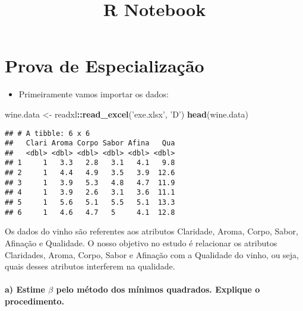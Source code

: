 \documentclass[
]{article}
\title{R Notebook}
\author{}
\date{\vspace{-2.5em}}
\newenvironment{Shaded}{\begin{snugshade}}{\end{snugshade}}
\newcommand{\KeywordTok}[1]{\textcolor[rgb]{0.13,0.29,0.53}{\textbf{#1}}}
\newcommand{\NormalTok}[1]{#1}
\newcommand{\OperatorTok}[1]{\textcolor[rgb]{0.81,0.36,0.00}{\textbf{#1}}}
\newcommand{\StringTok}[1]{\textcolor[rgb]{0.31,0.60,0.02}{#1}}
\providecommand{\tightlist}{%
  \setlength{\itemsep}{0pt}\setlength{\parskip}{0pt}}
\begin{document}
\maketitle

\hypertarget{prova-de-especializauxe7uxe3o}{%
\section{Prova de Especialização}\label{prova-de-especializauxe7uxe3o}}

\begin{itemize}
\tightlist
\item
  Primeiramente vamos importar os dados:
\end{itemize}

\begin{Shaded}
\begin{Highlighting}[]
\NormalTok{wine.data <-}\StringTok{ }\NormalTok{readxl}\OperatorTok{::}\KeywordTok{read_excel}\NormalTok{(}\StringTok{'exe.xlsx'}\NormalTok{, }\StringTok{'D'}\NormalTok{)}
\KeywordTok{head}\NormalTok{(wine.data)}
\end{Highlighting}
\end{Shaded}

\begin{verbatim}
## # A tibble: 6 x 6
##   Clari Aroma Corpo Sabor Afina   Qua
##   <dbl> <dbl> <dbl> <dbl> <dbl> <dbl>
## 1     1   3.3   2.8   3.1   4.1   9.8
## 2     1   4.4   4.9   3.5   3.9  12.6
## 3     1   3.9   5.3   4.8   4.7  11.9
## 4     1   3.9   2.6   3.1   3.6  11.1
## 5     1   5.6   5.1   5.5   5.1  13.3
## 6     1   4.6   4.7   5     4.1  12.8
\end{verbatim}

Os dados do vinho são referentes aos atributos Claridade, Aroma, Corpo,
Sabor, Afinação e Qualidade. O nosso objetivo no estudo é relacionar os
atributos Claridades, Aroma, Corpo, Sabor e Afinação com a Qualidade do
vinho, ou seja, quais desses atributos interferem na qualidade.

\hypertarget{a-estime-beta-pelo-muxe9todo-dos-muxednimos-quadrados.-explique-o-procedimento.}{%
\paragraph{\texorpdfstring{\textbf{a) Estime \(\beta\) pelo método dos
mínimos quadrados. Explique o
procedimento.}}{a) Estime \textbackslash beta pelo método dos mínimos quadrados. Explique o procedimento.}}\label{a-estime-beta-pelo-muxe9todo-dos-muxednimos-quadrados.-explique-o-procedimento.}}
\end{document}

